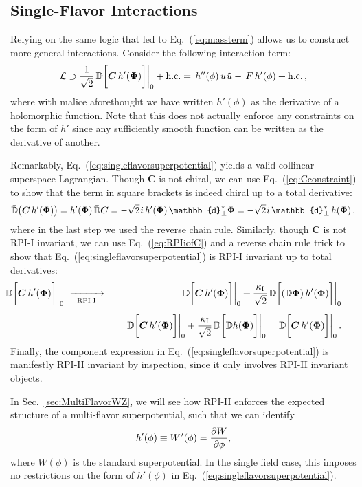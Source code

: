 \documentclass[12pt,document,nofootinbib,superscriptaddress,onecolumn,preprintnumbers,balancelastpage]{article}
\newcommand{\rpii}{{\kappa_\text{I}}}
\newcommand{\s}{\hspace{0.8pt}}
\newcommand{\PP}{\mathbb{d}}
\newcommand{\RPIi}{\,\,\xrightarrow[\hspace{5pt}\text{RPI-I}\hspace{5pt}]{}\,\,}
\DeclareRobustCommand{\Sec}[1]{Sec.~\ref{#1}}
\DeclareRobustCommand{\Eq}[1]{Eq.~(\ref{#1})}
\newcommand{\bPhi}{ \boldsymbol \Phi}
\newcommand{\bC}{ \boldsymbol C}
\newcommand{\D}{\mathbb{D}}
\newcommand{\bea}{\begin{eqnarray}}
\newcommand{\eea}{\end{eqnarray}}
\newcommand{\uu}{\tilde u}
\begin{document}
\begin{spacing}{1.2}
\subsection{Single-Flavor Interactions}
\label{subsec:singleflavor}


Relying on the same logic that led to \Eq{eq:massterm} allows us to construct more general interactions.
%
Consider the following interaction term: 
%
\begin{align}
\mathcal{L}  \supset \frac{1}{\sqrt{2}}\, \D  \bigg[ \bC\, h'(\bPhi) \bigg] \bigg|_{0} + \text{h.c.} =  \, h''(\phi) \, u \s \uu  -  \, F \, h'(\phi) + \text{h.c.}   \, ,
\label{eq:singleflavorsuperpotential}
\end{align}
%
where with malice aforethought we have written $h'(\phi)$ as the derivative of a holomorphic function.
%
Note that this does not actually enforce any constraints on the form of $h'$ since any sufficiently smooth function can be written as the derivative of another.


Remarkably, \Eq{eq:singleflavorsuperpotential} yields a valid collinear superspace Lagrangian.
%
Though $\bC$ is not chiral, we can use \Eq{eq:Cconstraint} to show that the term in square brackets is indeed chiral up to a total derivative:  %
\begin{equation}
\label{eq:chiral_check_single_field}
\bar{\D} \big(\bC\, h'(\bPhi) \big) = h'(\bPhi)\, \bar{\D} \bC  =  -\sqrt{2}\s i\,  h'(\bPhi)\, \PP_\perp^* \bPhi = -\sqrt{2}\s i\,  \PP_\perp^*\, h(\bPhi)\,,
\end{equation}
%
where in the last step we used the reverse chain rule.
%
Similarly, though $\bC$ is not RPI-I invariant, we can use \Eq{eq:RPIiofC} and a reverse chain rule trick to show that \Eq{eq:singleflavorsuperpotential} is RPI-I invariant up to total derivatives:
\bea
\hspace{-20pt} \D  \bigg[ \bC\, h'(\bPhi) \bigg] \bigg|_{0} \RPIi  &&  \D  \bigg[ \bC\, h'(\bPhi) \bigg] \bigg|_{0}+ \frac{\rpii}{\sqrt{2}}\,  \D  \bigg[ (\D \bPhi )\,h'(\bPhi) \bigg] \bigg|_{0}\nonumber \\[5pt] 
 && =  \D \bigg[ \bC\, h'(\bPhi) \bigg] \bigg|_{0}+ \frac{\rpii}{\sqrt{2}} \,  \D  \bigg[\D h(\bPhi) \bigg] \bigg|_{0}  =  \D \bigg[ \bC\, h'(\bPhi) \bigg] \bigg|_{0}\,.
\eea
%
Finally, the component expression in \Eq{eq:singleflavorsuperpotential} is manifestly RPI-II invariant by inspection, since it only involves RPI-II invariant objects.


In \Sec{sec:MultiFlavorWZ}, we will see how RPI-II enforces the expected structure of a multi-flavor superpotential, such that we can identify
%
\begin{equation}
h'(\phi) \equiv W^{\s\prime}(\phi) = \frac{\partial W}{\partial \phi},
\end{equation}
%
where $W(\phi)$ is the standard superpotential. 
%
In the single field case, this imposes no restrictions on the form of $h'(\phi)$ in \Eq{eq:singleflavorsuperpotential}.



\end{spacing}
\end{document}

